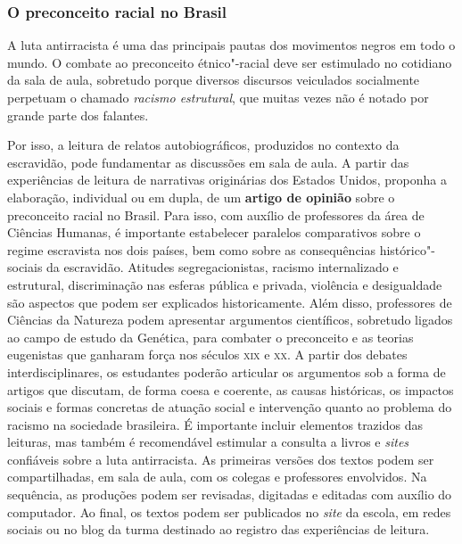 \documentclass[12pt]{extarticle}
\begin{document}

\subsubsection{O preconceito racial no Brasil}

A luta antirracista é uma das principais pautas dos movimentos negros
em todo o mundo. O combate ao preconceito étnico"-racial deve ser
estimulado no cotidiano da sala de aula, sobretudo porque diversos
discursos veiculados socialmente perpetuam o chamado \emph{racismo
estrutural}, que muitas vezes não é notado por grande parte dos
falantes. 

Por isso, a leitura de relatos autobiográficos, produzidos
no contexto da escravidão, pode fundamentar as discussões em sala de
aula. A partir das experiências de leitura de narrativas originárias
dos Estados Unidos, proponha a elaboração, individual ou em dupla, de
um \textbf{artigo de opinião} sobre o preconceito racial no Brasil.
Para isso, com auxílio de professores da área de Ciências Humanas, é
importante estabelecer paralelos comparativos sobre o regime
escravista nos dois países, bem como sobre as consequências
histórico"-sociais da escravidão. Atitudes segregacionistas, racismo
internalizado e estrutural, discriminação nas esferas pública e
privada, violência e desigualdade são aspectos que podem ser
explicados historicamente. Além disso, professores de Ciências da
Natureza podem apresentar argumentos científicos, sobretudo ligados ao
campo de estudo da Genética, para combater o preconceito e as teorias
eugenistas que ganharam força nos séculos \textsc{xix} e \textsc{xx}. A partir dos
debates interdisciplinares, os estudantes poderão articular os
argumentos sob a forma de artigos que discutam, de forma coesa e
coerente, as causas históricas, os impactos sociais e formas concretas
de atuação social e intervenção quanto ao problema do racismo na
sociedade brasileira. É importante incluir elementos trazidos das
leituras, mas também é recomendável estimular a consulta a livros e
\emph{sites} confiáveis sobre a luta antirracista. As primeiras
versões dos textos podem ser compartilhadas, em sala de aula, com os
colegas e professores envolvidos. Na sequência, as produções podem ser
revisadas, digitadas e editadas com auxílio do computador. Ao final,
os textos podem ser publicados no \emph{site} da escola, em redes
sociais ou no blog da turma destinado ao registro das experiências de
leitura.
\end{document}
